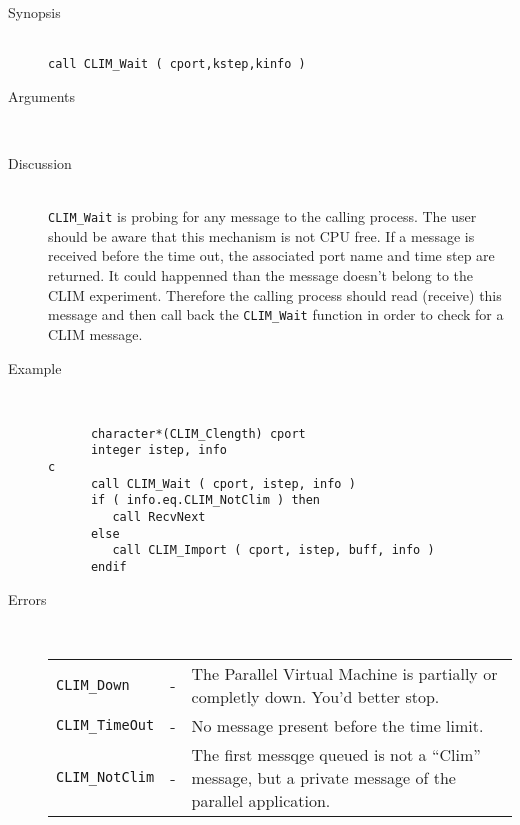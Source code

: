 \begin{description}
  \item[Synopsis]~ \\[10pt]
    {\tt call CLIM\_Wait ( cport,kstep,kinfo )}
  \item[Arguments]~
  \item[Discussion]~\\[10pt]
    {\tt CLIM\_Wait} is probing for any message to the calling process.
    The user should be aware that this mechanism is not CPU free. If a
    message is received before the time out, the associated port name
    and time step are returned. It could happenned than the message doesn't
    belong to the CLIM experiment. Therefore the calling process
    should read (receive) this message and then call back 
    the {\tt CLIM\_Wait} function in order to check for a CLIM message.
  \item[Example]~
    \begin{verbatim}
      character*(CLIM_Clength) cport
      integer istep, info
c
      call CLIM_Wait ( cport, istep, info )
      if ( info.eq.CLIM_NotClim ) then
         call RecvNext
      else
         call CLIM_Import ( cport, istep, buff, info )
      endif
    \end{verbatim}
  \item[Errors]~\\[10pt]
    \begin{tabular}{l l p{10cm} }
      {\tt CLIM\_Down} & - & The Parallel Virtual Machine is partially
or completly down. You'd better stop. \\
      {\tt CLIM\_TimeOut} & - & No message present before the time limit.\\
      {\tt CLIM\_NotClim} & - & The first messqge queued is not a
``Clim'' message, but a private message of the parallel application. \\
    \end{tabular}
\end{description}
